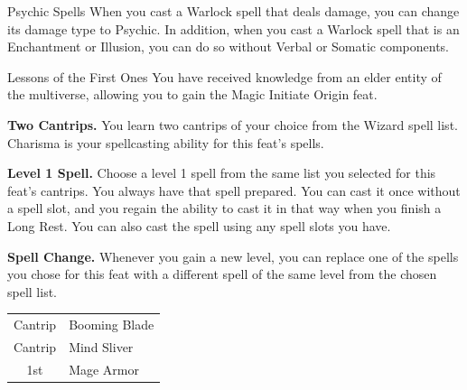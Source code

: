 \begin{Card}{Psychic Spells}
When you cast a Warlock spell that deals damage, you can change its damage type to Psychic. In addition, when you cast a Warlock spell that is an Enchantment or Illusion, you can do so without Verbal or Somatic components.
\end{Card}

\begin{Card}{Lessons of the First Ones}
You have received knowledge from an elder entity of the multiverse, allowing you to gain the Magic Initiate Origin feat.

\textbf{Two Cantrips.} You learn two cantrips of your choice from the Wizard spell list. Charisma is your spellcasting ability for this feat's spells.

\textbf{Level 1 Spell.} Choose a level 1 spell from the same list you selected for this feat's cantrips. You always have that spell prepared. You can cast it once without a spell slot, and you regain the ability to cast it in that way when you finish a Long Rest. You can also cast the spell using any spell slots you have.

\textbf{Spell Change.} Whenever you gain a new level, you can replace one of the spells you chose for this feat with a different spell of the same level from the chosen spell list.

\begin{tabular}{cl}
Cantrip & Booming Blade \\
Cantrip & Mind Sliver \\
1st & Mage Armor \\
\end{tabular}
\end{Card}

